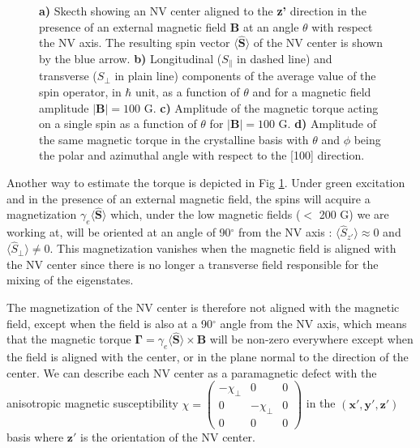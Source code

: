\documentclass[preprintnumbers,amsmath,amssymb,onecolumn,12pt]{revtex4}
\begin{document}
\begin{figure}[ht]
  \caption{\textbf{a)} Skecth showing an NV center aligned to the \textbf{z'} direction in the presence of an external magnetic field \textbf{B} at an angle $\theta$ with respect the NV axis. The resulting spin vector $\langle \mathbf{ \hat S} \rangle$ of the NV center is shown by the blue arrow.
   \textbf{b)} Longitudinal ($S_\parallel$ in dashed line) and transverse ($S_\perp$ in plain line) components of the average value of the spin operator, in $\hbar$ unit, as a function of $\theta$ and for a magnetic field amplitude $|\mathbf{B}|=100$ G.   
   \textbf{c)} Amplitude of the magnetic torque acting on a single spin as a function of $\theta$ for $|\mathbf{B}|=100$ G.
   \textbf{d)} Amplitude of the same magnetic torque in the crystalline basis with $\theta$ and $\phi$ being the polar and azimuthal angle with respect to the [100] direction.}
  		\label{Torque1classe}
\end{figure}


Another way to estimate the torque is depicted in Fig \ref{Torque1classe}. Under green excitation and in the presence of an external magnetic field, the spins will acquire a magnetization $\gamma_e \langle\hat{\mathbf S}\rangle$ which, under the low magnetic fields ($<$ 200 G) we are working at, will be oriented at an angle of 90$^\circ$ from the NV axis : $\langle \hat S_{z'} \rangle \approx 0$ and $\langle \hat S_\perp \rangle \neq 0$. This magnetization vanishes when the magnetic field is aligned with the NV center since there is no longer a transverse field responsible for the mixing of the eigenstates. 

The magnetization of the NV center is therefore not aligned with the magnetic field, except when the field is also at a 90$^\circ$ angle from the NV axis, which means that the magnetic torque $\mathbf \Gamma = \gamma_e \langle\hat{\mathbf S}\rangle \times \mathbf B $ will be non-zero everywhere except when the field is aligned with the center, or in the plane normal to the direction of the center. We can describe each NV center as a paramagnetic defect with the anisotropic magnetic susceptibility $\chi = \begin{pmatrix}-\chi_\perp & 0 & 0\\ 0 & -\chi_\perp & 0 \\ 0 & 0 & 0  \end{pmatrix}$ in the $(\mathbf{x'},\mathbf{y'},\mathbf{z'})$ basis where $\mathbf{z'}$ is the orientation of the NV center.
\end{document}
